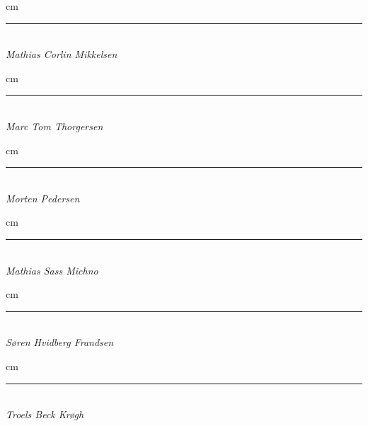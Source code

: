 \begin{minipage}{\textwidth}
\vspace{5cm}

			 cm
			\Large
      \begin{minipage}{0.45\textwidth}
      \centering
      \rule{\textwidth}{0.5pt}\\
			\textit{Mathias Corlin Mikkelsen}
      \end{minipage}
		
		  \vspace{70pt}
			 cm
			\Large
      \begin{minipage}{0.45\textwidth}
      \centering
      \rule{\textwidth}{0.5pt}\\
			\textit{Marc Tom Thorgersen}
		  \end{minipage}
    
		      \vspace{70pt}

			 cm
			\Large
      \begin{minipage}{0.45\textwidth}
      \centering
      \rule{\textwidth}{0.5pt}\\
			\textit{Morten Pedersen}
		  \end{minipage}
    
		      \vspace{70pt}

			 cm
			\Large
      \begin{minipage}{0.45\textwidth}
      \centering
      \rule{\textwidth}{0.5pt}\\
			\textit{Mathias Sass Michno}
		  \end{minipage}
          \vspace{70pt}

		
			 cm
			\Large
      \begin{minipage}{0.45\textwidth}
      \centering
      \rule{\textwidth}{0.5pt}\\
			\textit{Søren Hvidberg Frandsen}
		  \end{minipage}
          \vspace{70pt}

		
			 cm
			\Large
      \begin{minipage}{0.45\textwidth}
      \centering
      \rule{\textwidth}{0.5pt}\\
			\textit{Troels Beck Krøgh}
		  \end{minipage}
    
\end{minipage}